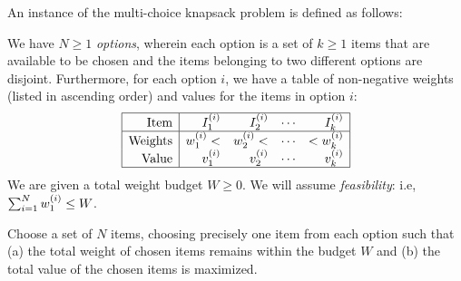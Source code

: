 \begin{problem}\label{MOK-Problem}
An instance of the multi-choice knapsack problem is defined as follows:
\begin{compactdesc}
\item[Inputs:] We have $N \geq 1$ \emph{options}, wherein each option is a set of  $k \geq 1$ items that are available to be chosen and the items belonging to two different options are disjoint. Furthermore, for each option $i$, we have a table of non-negative weights (listed in ascending order) and values for the items in option $i$:
    \[\begin{array}{|r|rrrr|}
            \hline
            \text{Item}    & I^{(i)}_{1}   & I^{(i)}_{2}   & \cdots & I^{(i)}_{k}   \\
            \hline
            \text{Weights} & w^{(i)}_{1} < & w^{(i)}_{2} < & \cdots & < w^{(i)}_{k} \\
            \text{Value}   & v^{(i)}_{1}   & v^{(i)}_{2}   & \cdots & v^{(i)}_{k}   \\
            \hline
        \end{array}    \]
    We are given a total weight budget $W \geq 0$. We will assume \emph{feasibility}: i.e, $\sum_{i=1}^N w^{(i)}_{1} \leq W$.
\item[Output:] Choose a set of $N$ items, choosing precisely one item from each option such that (a) the total weight of chosen items remains within the budget $W$ and (b) the total value of the chosen items is maximized.
\end{compactdesc}
\end{problem}

